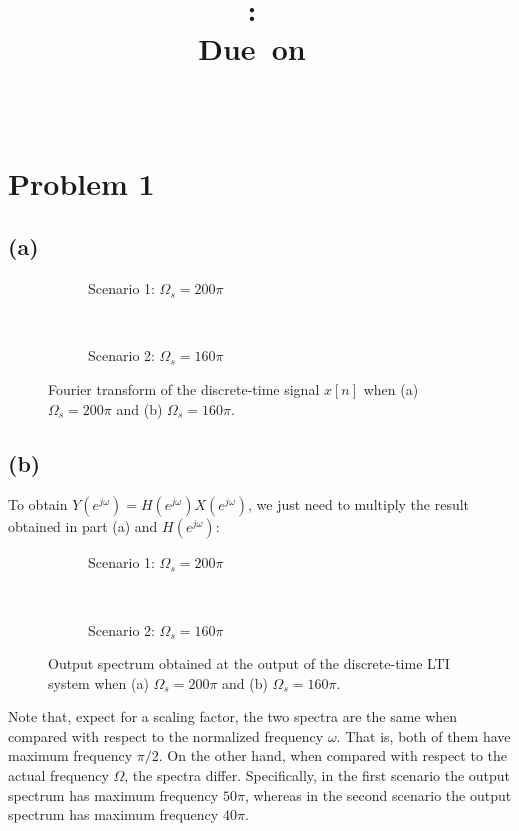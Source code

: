 \documentclass{article}
\title{
\vspace{2in}
\textmd{\textbf{\hmwkClass:\ \hmwkTitle}}\\
\normalsize\vspace{0.1in}\small{Due\ on\ \hmwkDueDate}\\
\vspace{0.1in}\large{\textit{\hmwkClassInstructor\ \hmwkClassTime}}
\vspace{3in}
}
\author{\textbf{\hmwkAuthorName}}
\date{} %
\begin{document}
\section{Problem 1}
\subsection{(a)}
\begin{figure}[h!]
	\centering
	\begin{subfigure}[h!]{0.5\textwidth}
		\resizebox{\textwidth}{!}{}
		\caption{Scenario 1: $\Omega_s = 200\pi$}
	\end{subfigure}%
	~ %
	\begin{subfigure}[h!]{0.5\textwidth}
		\resizebox{\textwidth}{!}{}
		\caption{Scenario 2: $\Omega_s = 160\pi$}
	\end{subfigure}
	\caption{Fourier transform of the discrete-time signal $x[n]$ when (a) $\Omega_s = 200\pi$ and (b) $\Omega_s = 160\pi$.}
\end{figure}

\subsection{(b)}
To obtain $Y(e^{j\omega}) = H(e^{j\omega})X(e^{j\omega})$, we just need to multiply the result obtained in part (a) and $H(e^{j\omega})$:

\begin{figure}[h!]
	\centering
	\begin{subfigure}[h!]{0.5\textwidth}
		\resizebox{\textwidth}{!}{}
		\caption{Scenario 1: $\Omega_s = 200\pi$}
	\end{subfigure}%
	~ %
	\begin{subfigure}[h!]{0.5\textwidth}
		\resizebox{\textwidth}{!}{}
		\caption{Scenario 2: $\Omega_s = 160\pi$}
	\end{subfigure}
	\caption{Output spectrum obtained at the output of the discrete-time LTI system when (a) $\Omega_s = 200\pi$ and (b) $\Omega_s = 160\pi$.}
\end{figure}
	
Note that, expect for a scaling factor, the two spectra are the same when compared with respect to the normalized frequency $\omega$. That is, both of them have maximum frequency $\pi/2$. On the other hand, when compared with respect to the actual frequency $\Omega$, the spectra differ. Specifically, in the first scenario the output spectrum has maximum frequency $50\pi$, whereas in the second scenario the output spectrum has maximum frequency $40\pi$.
	
\end{document}

